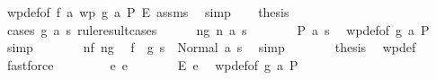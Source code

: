 \begin{isabellebody}
\ wp{\isacharunderscore}{\kern0pt}def{\isacharbrackleft}{\kern0pt}of\ f\ {\isachardoublequoteopen}{\isasymlambda}a{\isachardot}{\kern0pt}\ wp\ {\isacharparenleft}{\kern0pt}g\ a{\isacharparenright}{\kern0pt}\ P\ E{\isachardoublequoteclose}{\isacharbrackright}{\kern0pt}\ assms\ \isamarkupfalse%
\ simp\isanewline
\ \ \isamarkupfalse%
\ {\isacharquery}{\kern0pt}thesis\isanewline
\ \ \isamarkupfalse%
\ {\isacharparenleft}{\kern0pt}cases\ {\isachardoublequoteopen}g\ a\ s{\isacharprime}{\kern0pt}{\isachardoublequoteclose}\ rule{\isacharcolon}{\kern0pt}result{\isacharunderscore}{\kern0pt}cases{\isacharparenright}{\kern0pt}\isanewline
\ \ \ \ \isamarkupfalse%
\ ng{\isacharcolon}{\kern0pt}\ {\isacharparenleft}{\kern0pt}n\ a{\isacharprime}{\kern0pt}\ s{\isacharprime}{\kern0pt}{\isacharprime}{\kern0pt}{\isacharparenright}{\kern0pt}\isanewline
\ \ \ \ \isamarkupfalse%
\ \isamarkupfalse%
\ {\isachardoublequoteopen}P\ a{\isacharprime}{\kern0pt}\ s{\isacharprime}{\kern0pt}{\isacharprime}{\kern0pt}{\isachardoublequoteclose}\ \isamarkupfalse%
\ wp{\isacharunderscore}{\kern0pt}def{\isacharbrackleft}{\kern0pt}of\ {\isachardoublequoteopen}g\ a{\isachardoublequoteclose}\ P{\isacharbrackright}{\kern0pt}\ {\isacharasterisk}{\kern0pt}{\isacharasterisk}{\kern0pt}\ \isamarkupfalse%
\ simp\isanewline
\ \ \ \ \isamarkupfalse%
\ \isamarkupfalse%
\ nf\ ng\ \isamarkupfalse%
\ {\isachardoublequoteopen}{\isacharparenleft}{\kern0pt}f\ {\isasymbind}\ g{\isacharparenright}{\kern0pt}\ s\ {\isacharequal}{\kern0pt}\ Normal\ {\isacharparenleft}{\kern0pt}a{\isacharprime}{\kern0pt}{\isacharcomma}{\kern0pt}\ s{\isacharprime}{\kern0pt}{\isacharprime}{\kern0pt}{\isacharparenright}{\kern0pt}{\isachardoublequoteclose}\ \isamarkupfalse%
\ simp\isanewline
\ \ \ \ \isamarkupfalse%
\ \isamarkupfalse%
\ {\isacharquery}{\kern0pt}thesis\ \isamarkupfalse%
\ wp{\isacharunderscore}{\kern0pt}def\ \isamarkupfalse%
\ fastforce\isanewline
\ \ \isamarkupfalse%
\isanewline
\ \ \ \ \isamarkupfalse%
\ {\isacharparenleft}{\kern0pt}e\ e{\isacharparenright}{\kern0pt}\isanewline
\ \ \ \ \isamarkupfalse%
\ \isamarkupfalse%
\ {\isachardoublequoteopen}E\ e{\isachardoublequoteclose}\ \isamarkupfalse%
\ wp{\isacharunderscore}{\kern0pt}def{\isacharbrackleft}{\kern0pt}of\ {\isachardoublequoteopen}g\ a{\isachardoublequoteclose}\ P{\isacharbrackright}{\kern0pt}\ {\isacharasterisk}{\kern0pt}{\isacharasterisk}{\kern0pt}\ \isamarkupfalse%

\end{isabellebody}
